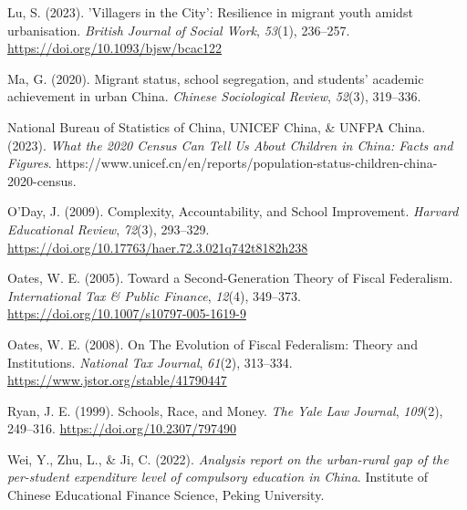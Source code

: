 \documentclass[
  man,
  floatsintext,
  longtable,
  nolmodern,
  notxfonts,
  notimes,
  colorlinks=true,linkcolor=blue,citecolor=blue,urlcolor=blue]{apa7}
\newlength{\cslhangindent}
\newenvironment{CSLReferences}[2] %
 {\begin{list}{}{%
  \setlength{\itemindent}{0pt}
  \setlength{\leftmargin}{0pt}
  \setlength{\parsep}{0pt}
  \ifodd #1
   \setlength{\leftmargin}{\cslhangindent}
   \setlength{\itemindent}{-1\cslhangindent}
  \fi
  \setlength{\itemsep}{#2\baselineskip}}}
 {\end{list}}
\begin{document}
\begin{CSLReferences}{1}{0}
Lu, S. (2023). '{Villagers} in the {City}': {Resilience} in migrant
youth amidst urbanisation. \emph{British Journal of Social Work},
\emph{53}(1), 236--257. \url{https://doi.org/10.1093/bjsw/bcac122}

Ma, G. (2020). Migrant status, school segregation, and students'
academic achievement in urban {China}. \emph{Chinese Sociological
Review}, \emph{52}(3), 319--336.

National Bureau of Statistics of China, UNICEF China, \& UNFPA China.
(2023). \emph{What the 2020 {Census Can Tell Us About Children} in
{China}: {Facts} and {Figures}}.
https://www.unicef.cn/en/reports/population-status-children-china-2020-census.

O'Day, J. (2009). Complexity, {Accountability}, and {School
Improvement}. \emph{Harvard Educational Review}, \emph{72}(3), 293--329.
\url{https://doi.org/10.17763/haer.72.3.021q742t8182h238}

Oates, W. E. (2005). Toward a {Second-Generation Theory} of {Fiscal
Federalism}. \emph{International Tax \& Public Finance}, \emph{12}(4),
349--373. \url{https://doi.org/10.1007/s10797-005-1619-9}

Oates, W. E. (2008). On {The Evolution} of {Fiscal Federalism}: {Theory}
and {Institutions}. \emph{National Tax Journal}, \emph{61}(2), 313--334.
\url{https://www.jstor.org/stable/41790447}

Ryan, J. E. (1999). Schools, {Race}, and {Money}. \emph{The Yale Law
Journal}, \emph{109}(2), 249--316. \url{https://doi.org/10.2307/797490}

Wei, Y., Zhu, L., \& Ji, C. (2022). \emph{Analysis report on the
urban-rural gap of the per-student expenditure level of compulsory
education in {China}}. Institute of Chinese Educational Finance Science,
Peking University.

\end{CSLReferences}
\end{document}
